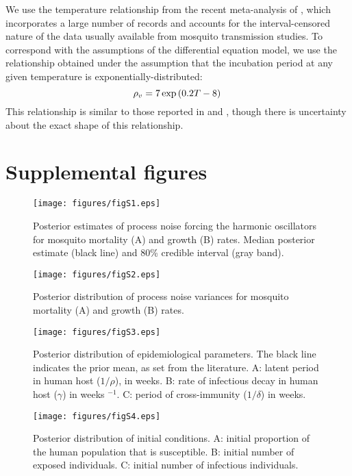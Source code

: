 \documentclass[12pt,letterpaper]{article}
\begin{document}
\begin{itemize}
We use the temperature relationship from the recent meta-analysis of \cite{Chan2012}, which incorporates a large number of records and accounts for the interval-censored nature of the data usually available from mosquito transmission studies.
To correspond with the assumptions of the differential equation model, we use the relationship obtained under the assumption that the incubation period at any given temperature is exponentially-distributed:
\begin{equation}
\rho_v = 7\exp \left(0.2T - 8\right)\\
\end{equation}
This relationship is similar to those reported in \cite{Focks1995} and \cite{Tjaden2013}, though there is uncertainty about the exact shape of this relationship.
\end{itemize}




\newpage

\section*{Supplemental figures}

\begin{figure}[!h]
\texttt{[image: figures/figS1.eps]}
\caption{
Posterior estimates of process noise forcing the harmonic oscillators for mosquito mortality (A) and growth (B) rates.  Median posterior estimate (black line) and 80\% credible interval (gray band).
}
\end{figure}

\begin{figure}[!h]
\texttt{[image: figures/figS2.eps]}
\caption{
Posterior distribution of process noise variances for mosquito mortality (A) and growth (B) rates.
}
\end{figure}

\begin{figure}[!h]
\texttt{[image: figures/figS3.eps]}
\caption{
Posterior distribution of epidemiological parameters.  The black line indicates the prior mean, as set from the literature.  A: latent period in human host ($1/\rho$), in weeks. B: rate of infectious decay in human host ($\gamma$) in weeks $^{-1}$. C: period of cross-immunity ($1/\delta$) in weeks.
}
\end{figure}

\begin{figure}[!h]
\texttt{[image: figures/figS4.eps]}
\caption{Posterior distribution of initial conditions. A: initial proportion of the human population that is susceptible. B: initial number of exposed individuals. C: initial number of infectious individuals.
}
\end{figure}
\end{document}
